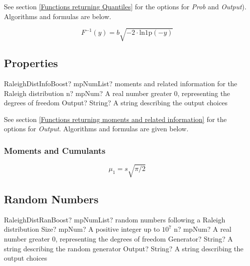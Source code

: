 See section \ref{Functions returning Quantiles} for the options for  {\itshape\sffamily Prob} and {\itshape\sffamily Output}). Algorithms and formulas are below.

\begin{equation} 
	F^{-1}(y)= b \sqrt{-2 \cdot \text{ln1p}(-y)}
\end{equation}



\subsection{Properties}
\label{RaleighDistributionProperties}


\begin{mpFunctionsExtract}
	\mpFunctionTwoNotImplemented
	{RaleighDistInfoBoost? mpNumList? moments and related information for the Raleigh distribution}
	{n? mpNum? A real number greater 0, representing the degrees of freedom}
	{Output? String? A string describing the output choices}
\end{mpFunctionsExtract}

\vspace{0.3cm}

See section \ref{Functions returning moments and related information} for the options for {\itshape\sffamily Output}. Algorithms and formulas are given below.

\subsubsection{Moments and Cumulants}
\begin{equation} 
	\mu_1 = s \sqrt{\pi/2}
\end{equation}



\subsection{Random Numbers}

\begin{mpFunctionsExtract}
	\mpFunctionFourNotImplemented
	{RaleighDistRanBoost? mpNumList? random numbers following a Raleigh distribution}
	{Size? mpNum? A positive integer up to $10^7$}
	{n? mpNum? A real number greater 0, representing the degrees of freedom}
	{Generator? String? A string describing the random generator}
	{Output? String? A string describing the output choices}
\end{mpFunctionsExtract}


